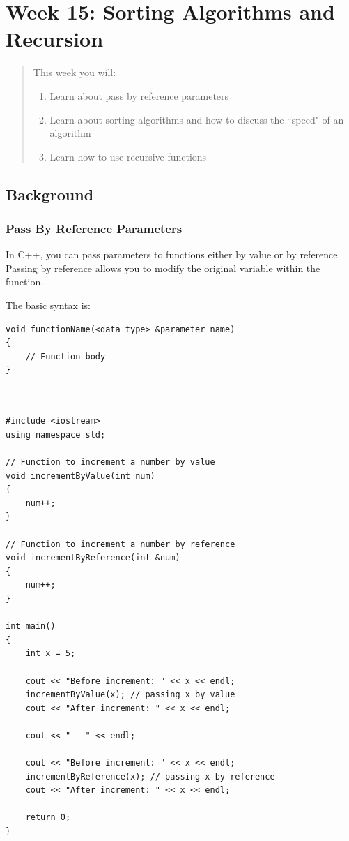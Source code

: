 \chapter*{Week 15: Sorting Algorithms and Recursion}
\setcounter{chapter}{15}
\setcounter{section}{0}


\begin{abstract}
This week you will:
\begin{enumerate}
    \item Learn about pass by reference parameters
    \item Learn about sorting algorithms and how to discuss the ``speed" of an algorithm
    \item Learn how to use recursive functions

\end{enumerate}
    
\end{abstract}

\section{Background}

\subsection{Pass By Reference Parameters}

In C++, you can pass parameters to functions either by value or by reference. Passing by reference allows you to modify the original variable within the function.

The basic syntax is:

\begin{verbatim}
void functionName(<data_type> &parameter_name)
{
    // Function body
}
\end{verbatim}

\begin{example}
    \begin{verbatim}

    
#include <iostream>
using namespace std;

// Function to increment a number by value
void incrementByValue(int num)
{
    num++;
}

// Function to increment a number by reference
void incrementByReference(int &num)
{
    num++;
}

int main()
{
    int x = 5;

    cout << "Before increment: " << x << endl;
    incrementByValue(x); // passing x by value
    cout << "After increment: " << x << endl;

    cout << "---" << endl;

    cout << "Before increment: " << x << endl;
    incrementByReference(x); // passing x by reference
    cout << "After increment: " << x << endl;

    return 0;
}
    \end{verbatim}
\end{example}

